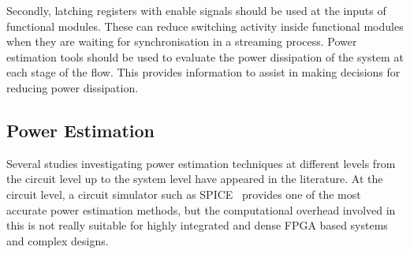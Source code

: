 Secondly, latching registers with enable signals should be used at the inputs of functional modules.
These can reduce switching activity inside functional modules when they are waiting for synchronisation in a streaming process.
Power estimation tools should be used to evaluate the power dissipation of the system at each stage of the flow.
This provides information to assist in making decisions for reducing power dissipation.

\subsection{Power Estimation}

Several studies investigating power estimation techniques at different levels from the circuit level up to the system level have appeared in the literature.
At the circuit level, a circuit simulator such as SPICE~\cite{Deng1994} provides one of the most accurate power estimation methods, but the computational overhead involved in this is not really suitable for highly integrated and dense FPGA based systems and complex designs.

%

